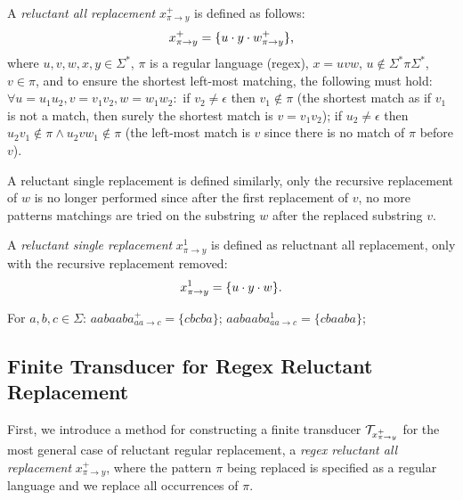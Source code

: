 
\begin{definition} \hfill \newline
  A \emph{reluctant all replacement} $x^{+}_{\pi \rightarrow y}$ is defined as follows: \newline
  $$x^{+}_{\pi \rightarrow y} = \{ u \cdot y \cdot w^{+}_{\pi \rightarrow y} \} \text{,}$$
  where $u, v, w, x, y \in \Sigma^*$, $\pi$ is a regular language (regex), $x = u v w$, $u \notin \Sigma^* \pi \Sigma^*$, $v \in \pi$, and to ensure the shortest left-most matching, the following must hold: $\forall u = u_1 u_2, v = v_1 v_2, w = w_1 w_2:$ if $v_2 \neq \epsilon$ then $v_1 \notin \pi$ (the shortest match as if $v_1$ is not a match, then surely the  shortest match is $v = v_1v_2$); if $u_2 \neq \epsilon$ then $u_2 v_1 \notin \pi \land u_2 v w_1 \notin \pi$ (the left-most match is $v$ since there is no match of $\pi$ before $v$).
\end{definition}

A reluctant single replacement is defined similarly, only the recursive replacement of $w$ is no longer performed since after the first replacement of $v$, no more patterns matchings are tried on the substring $w$ after the replaced substring $v$.
\begin{definition} \hfill \newline
  A \emph{reluctant single replacement} $x^{1}_{\pi \rightarrow y}$ is defined as reluctnant all replacement, only with the recursive replacement removed:
  $$x^{1}_{\pi \rightarrow y} = \{ u \cdot y \cdot w \} \text{.}$$
\end{definition}

\begin{example}
  For $a, b, c \in \Sigma$: $aabaaba^{+}_{aa \rightarrow c} = \{ cbcba \}$; $aabaaba^{1}_{aa \rightarrow c} = \{ cbaaba \}$;
\end{example}

\subsection{Finite Transducer for Regex Reluctant Replacement}

First, we introduce a method for constructing a finite transducer $\mathcal{T}_{x^{+}_{\pi \rightarrow y}}$ for the most general case of reluctant regular replacement, a \emph{regex reluctant all replacement} $x^{+}_{\pi \rightarrow y}$, where the pattern $\pi$ being replaced is specified as a regular language and we replace all occurrences of $\pi$.

